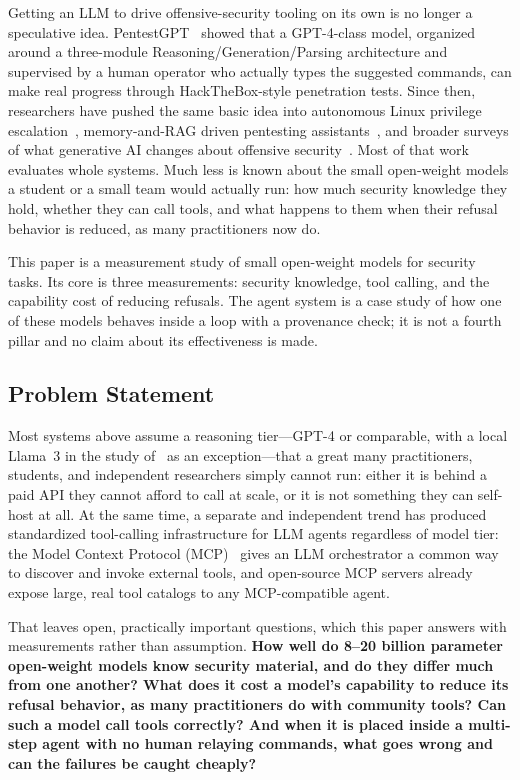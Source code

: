 \documentclass[conference]{IEEEtran}
\begin{document}
Getting an LLM to drive offensive-security tooling on its own is no longer a
speculative idea. PentestGPT~\cite{pentestgpt} showed that a GPT-4-class
model, organized around a three-module Reasoning/Generation/Parsing
architecture and supervised by a human operator who actually types the
suggested commands, can make real progress through HackTheBox-style
penetration tests. Since then, researchers have pushed the same basic idea
into autonomous Linux privilege escalation~\cite{happe2026}, memory-and-RAG
driven pentesting assistants~\cite{alsabbagh2026}, and broader surveys of
what generative AI changes about offensive security~\cite{hilario2024}.
Most of that work evaluates whole systems. Much less is known about the
small open-weight models a student or a small team would actually run: how
much security knowledge they hold, whether they can call tools, and what
happens to them when their refusal behavior is reduced, as many
practitioners now do.

This paper is a measurement study of small open-weight models for security
tasks. Its core is three measurements: security knowledge, tool calling,
and the capability cost of reducing refusals. The agent system is a case
study of how one of these models behaves inside a loop with a provenance
check; it is not a fourth pillar and no claim about its effectiveness is made.

\subsection{Problem Statement}
\label{sec:problem}

Most systems above assume a reasoning tier---GPT-4 or comparable, with a
local Llama~3 in the study of~\cite{happe2026} as an exception---that a
great many practitioners, students, and independent researchers simply
cannot run: either it is behind a paid API they cannot afford to call at
scale, or it is not something they can self-host at all. At the same time, a
separate and independent trend has produced standardized tool-calling
infrastructure for LLM agents regardless of model tier: the Model Context
Protocol (MCP)~\cite{mcp-spec} gives an LLM orchestrator a common way to
discover and invoke external tools, and open-source MCP servers already
expose large, real tool catalogs to any MCP-compatible agent.

That leaves open, practically important questions, which this paper
answers with measurements rather than assumption. \textbf{How well do
8--20 billion parameter open-weight models know security material, and do
they differ much from one another? What does it cost a model's capability to
reduce its refusal behavior, as many practitioners do with community
tools? Can such a model call tools correctly? And when it is placed inside a
multi-step agent with no human relaying commands, what goes wrong and can
the failures be caught cheaply?}
\end{document}
